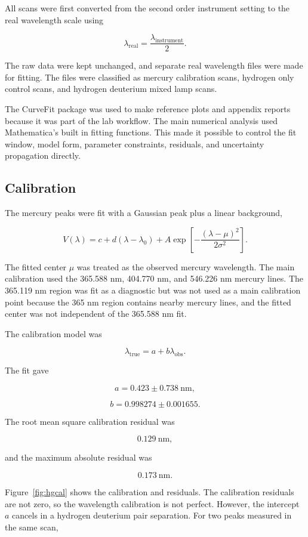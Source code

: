 \documentclass[11pt]{article}
\begin{document}
All scans were first converted from the second order instrument setting to the real wavelength scale using

\[
\lambda_{\mathrm{real}} = \frac{\lambda_{\mathrm{instrument}}}{2}.
\]

The raw data were kept unchanged, and separate real wavelength files were made for fitting. The files were classified as mercury calibration scans, hydrogen only control scans, and hydrogen deuterium mixed lamp scans.

The CurveFit package was used to make reference plots and appendix reports because it was part of the lab workflow. The main numerical analysis used Mathematica's built in fitting functions. This made it possible to control the fit window, model form, parameter constraints, residuals, and uncertainty propagation directly.

\subsection{Calibration}

The mercury peaks were fit with a Gaussian peak plus a linear background,

\[
V(\lambda)
=
c + d(\lambda - \lambda_0)
+
A \exp\left[-\frac{(\lambda - \mu)^2}{2\sigma^2}\right].
\]

The fitted center \(\mu\) was treated as the observed mercury wavelength. The main calibration used the 365.588 nm, 404.770 nm, and 546.226 nm mercury lines. The 365.119 nm region was fit as a diagnostic but was not used as a main calibration point because the 365 nm region contains nearby mercury lines, and the fitted center was not independent of the 365.588 nm fit.

The calibration model was

\[
\lambda_{\mathrm{true}} = a + b\lambda_{\mathrm{obs}}.
\]

The fit gave

\[
a = 0.423 \pm 0.738 \ \mathrm{nm},
\]

\[
b = 0.998274 \pm 0.001655.
\]

The root mean square calibration residual was

\[
0.129 \ \mathrm{nm},
\]

and the maximum absolute residual was

\[
0.173 \ \mathrm{nm}.
\]

Figure~\ref{fig:hgcal} shows the calibration and residuals. The calibration residuals are not zero, so the wavelength calibration is not perfect. However, the intercept \(a\) cancels in a hydrogen deuterium pair separation. For two peaks measured in the same scan,
\end{document}
